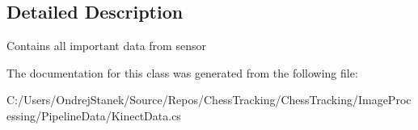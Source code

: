 \subsection{Detailed Description}
Contains all important data from sensor 



The documentation for this class was generated from the following file\+:\begin{DoxyCompactItemize}
\item 
C\+:/\+Users/\+Ondrej\+Stanek/\+Source/\+Repos/\+Chess\+Tracking/\+Chess\+Tracking/\+Image\+Processing/\+Pipeline\+Data/Kinect\+Data.\+cs\end{DoxyCompactItemize}
